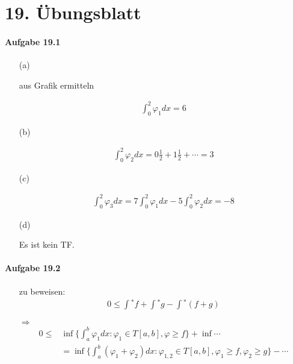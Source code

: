 \section{19. Übungsblatt}

\paragraph{Aufgabe 19.1}

\begin{enumerate}

\item[(a)]

aus Grafik ermitteln

\begin{align*}
\int_0^2\varphi_1dx=6
\end{align*}

\item[(b)]

\begin{align*}
\int_0^2\varphi_2dx=0\frac{1}{2}+1\frac{1}{2}+\cdots=3
\end{align*}

\item[(c)]

\begin{align*}
\int_0^2\varphi_3dx=7\int_0^2\varphi_1dx-5\int_0^2\varphi_2dx=-8
\end{align*}

\item[(d)]

Es ist kein TF.

\end{enumerate}

\newpage

\paragraph{Aufgabe 19.2}

\begin{enumerate}

\item[]

zu beweisen:
\begin{align*}
0\leq\int{}^*f+\int{}^*g-\int{}^*(f+g)
\end{align*}

$\Rightarrow$
\begin{align*}
0\leq & \inf\{\int_a^b\varphi_1dx:\varphi_1\in T[a,b],\varphi\geq f\}+\inf\cdots \\
&=
\inf\{\int_a^b(\varphi_1+\varphi_2)dx:\varphi_{1,2}\in T[a,b],\varphi_1\geq f,\varphi_2\geq g\}-\cdots	
\end{align*}

\end{enumerate}


